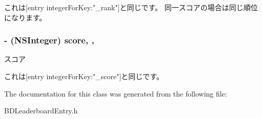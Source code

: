 これは\mbox{[}entry integer\-For\-Key\-:"\-\_\-rank"\mbox{]}と同じです。 同一スコアの場合は同じ順位になります。 \hypertarget{interface_b_d_leaderboard_entry_aede55712f84c6407fbf04b4e97a810b1}{
\subsubsection[{score}]{\setlength{\rightskip}{0pt plus 5cm}-\/ (N\-S\-Integer) score\hspace{0.3cm}{\ttfamily [read]}, {\ttfamily [atomic]}, {\ttfamily [assign]}}}\label{interface_b_d_leaderboard_entry_aede55712f84c6407fbf04b4e97a810b1}


スコア 

これは\mbox{[}entry integer\-For\-Key\-:"\-\_\-score"\mbox{]}と同じです。 

The documentation for this class was generated from the following file\-:\begin{DoxyCompactItemize}
\item 
B\-D\-Leaderboard\-Entry.\-h\end{DoxyCompactItemize}
